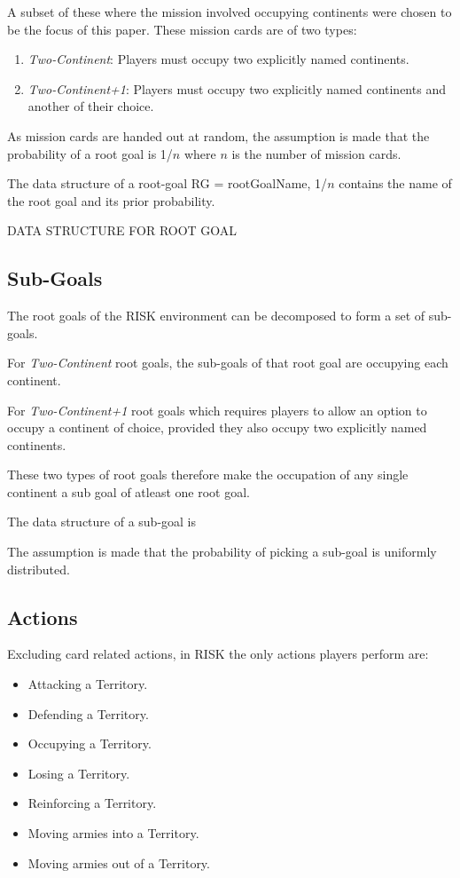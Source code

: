 \documentclass[parskip]{cs4rep}
\begin{document}
A subset of these where the mission involved occupying continents were chosen to be the focus of this paper. These mission cards are of two types:

\begin{enumerate}
\item
\textit{Two-Continent}: Players must occupy two explicitly named continents.
\item
\textit{Two-Continent+1}: Players must occupy two explicitly named continents and another of their choice.
\end{enumerate}

As mission cards are handed out at random, the assumption is made that the probability of a root goal is 1/$n$ where $n$ is the number of mission cards.

The data structure of a root-goal RG = { rootGoalName, 1/$n$} contains the name of the root goal and its prior probability.

DATA STRUCTURE FOR ROOT GOAL

\subsection{Sub-Goals}

The root goals of the RISK environment can be decomposed to form a set of sub-goals. 

For \textit{Two-Continent} root goals, the sub-goals of that root goal are occupying each continent. 

For \textit{Two-Continent+1} root goals which requires players to allow an option to occupy a continent of choice, provided they also occupy two explicitly named continents. 

These two types of root goals therefore make the occupation of any single continent a sub goal of atleast one root goal.

The data structure of a sub-goal is 

The assumption is made that the probability of picking a sub-goal is uniformly distributed.

\subsection{Actions}

Excluding card related actions, in RISK the only actions players perform are:

\begin{itemize}
\item
Attacking a Territory.
\item
Defending a Territory.
\item
Occupying a Territory.
\item
Losing a Territory.
\item
Reinforcing a Territory.
\item
Moving armies into a Territory.
\item
Moving armies out of a Territory.
\end{itemize}
\end{document}
